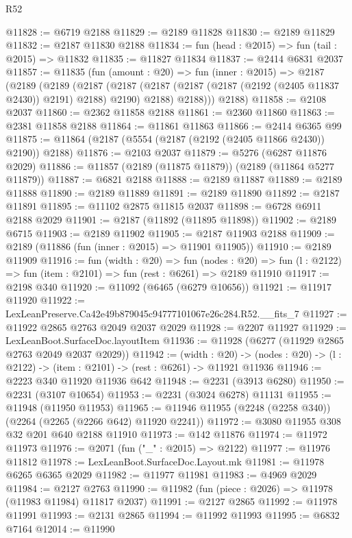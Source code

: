 \begin{lexlean}{R52}
\begin{coremodule}
@11828 := @6719 @2188
@11829 := @2189 @11828
@11830 := @2189 @11829
@11832 := @2187 @11830 @2188
@11834 := fun (head : @2015) => fun (tail : @2015) => @11832
@11835 := @11827 @11834
@11837 := @2414 @6831 @2037
@11857 := @11835
    (fun (amount : @20) =>
    fun (inner : @2015) =>
    @2187
      (@2189
        (@2189
          (@2187
            (@2187 (@2187 (@2187 (@2187 (@2192 (@2405 @11837 @2430)) @2191) @2188) @2190) @2188)
            @2188)))
      @2188)
@11858 := @2108 @2037
@11860 := @2362 @11858 @2188
@11861 := @2360 @11860
@11863 := @2381 @11858 @2188
@11864 := @11861 @11863
@11866 := @2414 @6365 @99
@11875 := @11864 (@2187 (@5554 (@2187 (@2192 (@2405 @11866 @2430)) @2190)) @2188)
@11876 := @2103 @2037
@11879 := @5276 (@6287 @11876 @2029)
@11886 := @11857 (@2189 (@11875 @11879)) (@2189 (@11864 @5277 @11879))
@11887 := @6821 @2188
@11888 := @2189 @11887
@11889 := @2189 @11888
@11890 := @2189 @11889
@11891 := @2189 @11890
@11892 := @2187 @11891
@11895 := @11102 @2875 @11815 @2037
@11898 := @6728 @6911 @2188 @2029
@11901 := @2187 (@11892 (@11895 @11898))
@11902 := @2189 @6715
@11903 := @2189 @11902
@11905 := @2187 @11903 @2188
@11909 := @2189 (@11886 (fun (inner : @2015) => @11901 @11905))
@11910 := @2189 @11909
@11916 := fun (width : @20) =>
  fun (nodes : @20) => fun (l : @2122) => fun (item : @2101) => fun (rest : @6261) => @2189 @11910
@11917 := @2198 @340
@11920 := @11092 (@6465 (@6279 @10656))
@11921 := @11917 @11920
@11922 := LexLeanPreserve.Ca42e49b879045c94777101067e26c284.R52.__fits_7
@11927 := @11922 @2865 @2763 @2049 @2037 @2029
@11928 := @2207 @11927
@11929 := LexLeanBoot.SurfaceDoc.layoutItem
@11936 := @11928 (@6277 (@11929 @2865 @2763 @2049 @2037 @2029))
@11942 := (width : @20) ->
  (nodes : @20) -> (l : @2122) -> (item : @2101) -> (rest : @6261) -> @11921 @11936
@11946 := @2223 @340 @11920 @11936 @642
@11948 := @2231 (@3913 @6280)
@11950 := @2231 (@3107 @10654)
@11953 := @2231 (@3024 @6278) @11131
@11955 := @11948 (@11950 @11953)
@11965 := @11946 @11955 (@2248 (@2258 @340)) (@2264 (@2265 (@2266 @642) @11920 @2241))
@11972 := @3080 @11955 @308 @32 @201 @640 @2188 @11910
@11973 := @142 @11876
@11974 := @11972 @11973
@11976 := @2071 (fun ("_" : @2015) => @2122)
@11977 := @11976 @11812
@11978 := LexLeanBoot.SurfaceDoc.Layout.mk
@11981 := @11978 @6265 @6365 @2029
@11982 := @11977 @11981
@11983 := @4969 @2029
@11984 := @2127 @2763
@11990 := @11982 (fun (piece : @2026) => @11978 (@11983 @11984) @11817 @2037)
@11991 := @2127 @2865
@11992 := @11978 @11991
@11993 := @2131 @2865
@11994 := @11992 @11993
@11995 := @6832 @7164
@12014 := @11990

\end{coremodule}
\end{lexlean}

